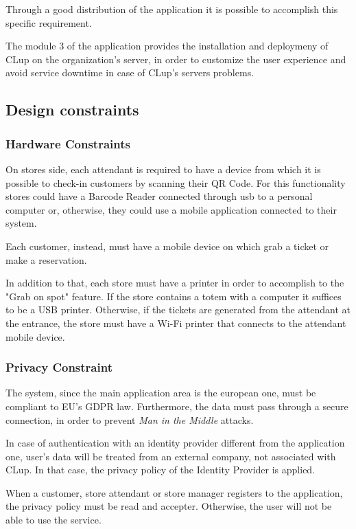 \documentclass[table, 12pt]{article}
\begin{document}
Through a good distribution of the application it is possible to accomplish this specific requirement.

The module 3 of the application provides the installation and deploymeny of CLup on the organization's server, in order to customize the user experience and avoid service downtime in case of CLup's servers problems.

\subsection{Design constraints}
\subsubsection{Hardware Constraints}
On stores side, each attendant is required to have a device from which it is possible to check-in customers by scanning their QR Code.
For this functionality stores could have a Barcode Reader connected through usb to a personal computer or, otherwise, they could use a mobile application connected to their system.

Each customer, instead, must have a mobile device on which grab a ticket or make a reservation.

In addition to that, each store must have a printer in order to accomplish to the "Grab on spot" feature. If the store contains a totem with a computer it suffices to be a USB printer. Otherwise, if the tickets are generated from the attendant at the entrance, the store must have a Wi-Fi printer that connects to the attendant mobile device.

\subsubsection{Privacy Constraint}
The system, since the main application area is the european one, must be compliant to EU's GDPR law. Furthermore, the data must pass through a secure connection, in order to prevent \textit{Man in the Middle} attacks.

In case of authentication with an identity provider different from the application one, user's data will be treated from an external company, not associated with CLup. In that case, the privacy policy of the Identity Provider is applied.

When a customer, store attendant or store manager registers to the application, the privacy policy must be read and accepter. Otherwise, the user will not be able to use the service.
\end{document}
